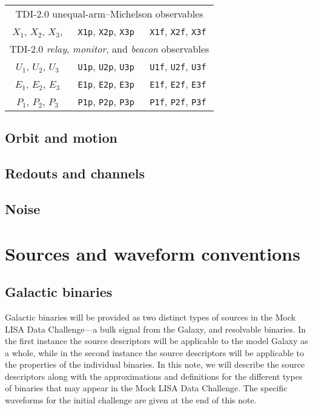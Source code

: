 \documentclass[11pt]{report}
\begin{document}
\begin{center}
\begin{tabular}{c|c|c}
\hline
\multicolumn{3}{c}{TDI-2.0 unequal-arm--Michelson observables} \\
$X_1$, $X_2$, $X_3$, & \texttt{X1p}, \texttt{X2p}, \texttt{X3p} & \texttt{X1f}, \texttt{X2f}, \texttt{X3f} \\
\hline
\multicolumn{3}{c}{TDI-2.0 \emph{relay}, \emph{monitor}, and \emph{beacon} observables} \\
$U_1$, $U_2$, $U_3$ & \texttt{U1p}, \texttt{U2p}, \texttt{U3p} & \texttt{U1f}, \texttt{U2f}, \texttt{U3f} \\
$E_1$, $E_2$, $E_3$ & \texttt{E1p}, \texttt{E2p}, \texttt{E3p} & \texttt{E1f}, \texttt{E2f}, \texttt{E3f} \\
$P_1$, $P_2$, $P_3$ & \texttt{P1p}, \texttt{P2p}, \texttt{P3p} & \texttt{P1f}, \texttt{P2f}, \texttt{P3f} \\
\hline \hline
\end{tabular}
\end{center}





\section{Orbit and motion}

\section{Redouts and channels}

\section{Noise}

\chapter{Sources and waveform conventions}

\section{Galactic binaries}

Galactic binaries will be provided as two distinct types of sources in the Mock LISA Data Challenge---a bulk signal from the Galaxy, and resolvable binaries. In the first instance the source descriptors will be applicable to the model Galaxy as a whole, while in the second instance the source descriptors will be applicable to the properties of the individual binaries. In this note, we will describe the source descriptors along with the approximations and definitions for the different types of binaries that may appear in the Mock LISA Data Challenge. The specific waveforms for the initial challenge are given at the end of this note.
\end{document}
